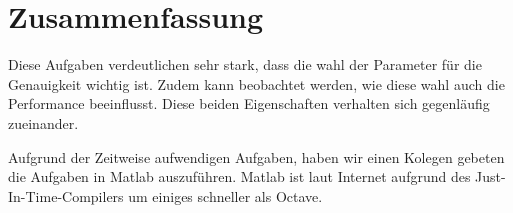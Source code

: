 \chapter{Zusammenfassung}

Diese Aufgaben verdeutlichen sehr stark, dass die wahl der Parameter für die Genauigkeit wichtig ist. Zudem kann beobachtet werden, wie diese wahl auch die Performance beeinflusst. Diese beiden Eigenschaften verhalten sich gegenläufig zueinander.

Aufgrund der Zeitweise aufwendigen Aufgaben, haben wir einen Kolegen gebeten die Aufgaben in Matlab auszuführen. Matlab ist laut Internet aufgrund des Just-In-Time-Compilers um einiges schneller als Octave.
